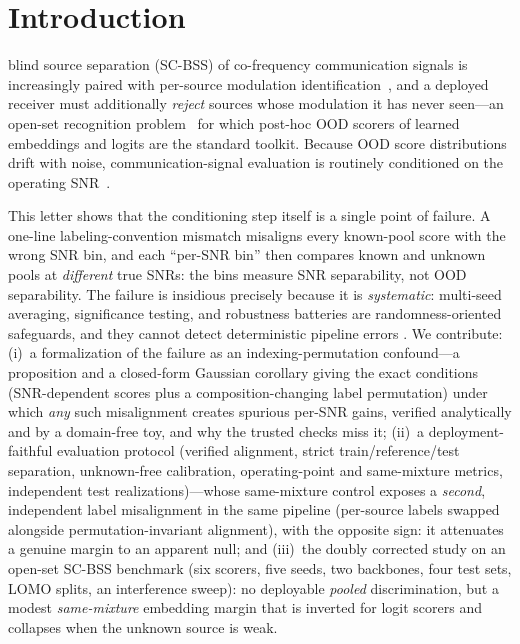 \documentclass[journal,letterpaper]{IEEEtran}
\begin{document}
\section{Introduction}
\label{sec:intro}

 blind source separation (SC-BSS) of
co-frequency communication signals is increasingly paired with
per-source modulation identification~\cite{hou2022single,guo2024single},
and a deployed receiver must additionally \emph{reject} sources whose
modulation it has never seen---an open-set recognition
problem~\cite{scheirer2013open,li2023expert} for which post-hoc OOD
scorers of learned embeddings and logits
\cite{hendrycks2017msp,liang2018odin,liu2020energy,lee2018mahalanobis,du2022vos}
are the standard toolkit. Because OOD score distributions drift with
noise, communication-signal evaluation is routinely conditioned on the
operating SNR~\cite{proakis2008digital,oshea2017intro,li2023expert}.

This letter shows that the conditioning step itself is a single point
of failure. A one-line labeling-convention mismatch misaligns every
known-pool score with the wrong SNR bin, and each ``per-SNR bin'' then
compares known and unknown pools at \emph{different} true SNRs: the
bins measure SNR separability, not OOD separability. The failure is insidious precisely because it is
\emph{systematic}: multi-seed averaging, significance testing, and
robustness batteries are randomness-oriented safeguards, and they
cannot detect deterministic pipeline errors
\cite{kapoor2023leakage,musgrave2020reality}. We contribute:
(i)~a formalization of the failure as an indexing-permutation
confound---a proposition and a closed-form Gaussian corollary giving
the exact conditions (SNR-dependent scores plus a composition-changing
label permutation) under which \emph{any} such misalignment creates
spurious per-SNR gains, verified analytically and by a domain-free toy,
and why the trusted checks miss it;
(ii)~a deployment-faithful evaluation protocol (verified alignment,
strict train/reference/test separation, unknown-free calibration,
operating-point and same-mixture metrics, independent test
realizations)---whose same-mixture control exposes a
\emph{second}, independent label misalignment in the same pipeline
(per-source labels swapped alongside permutation-invariant alignment),
with the opposite sign: it attenuates a genuine margin to an apparent
null; and (iii)~the doubly corrected study on an open-set SC-BSS
benchmark (six scorers, five seeds, two backbones, four test sets,
LOMO splits, an interference sweep): no deployable
\emph{pooled} discrimination, but a modest \emph{same-mixture}
embedding margin that is inverted for logit scorers and collapses when
the unknown source is weak.
\end{document}
